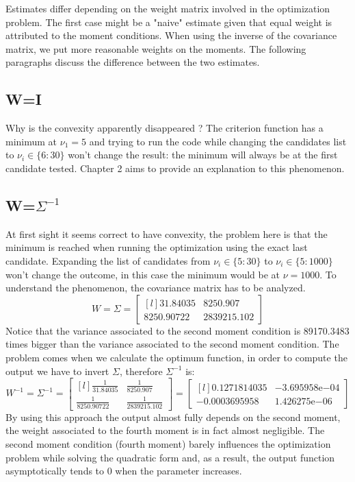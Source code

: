 Estimates differ depending on the weight matrix involved in the optimization problem. The first case might be a "naive" estimate given that equal weight is attributed to the moment conditions.  When using the inverse of the covariance matrix, we put more reasonable weights on the moments. The following paragraphs discuss the difference between the two estimates.


\subsection{W=I}
Why is the convexity apparently disappeared ? The criterion function has a minimum at $\nu_1=5$ and trying to run the code while changing the candidates list to $\nu_i \in \{6:30\}$ won't change the result: the minimum will always be at the first candidate tested. Chapter 2 aims to provide an explanation to this phenomenon.

\subsection{W=$\Sigma^{-1}$}
At first sight it seems correct to have convexity, the problem here is that the minimum is reached when running the optimization using the exact last candidate. Expanding the list of candidates from $\nu_i \in \{5:30\}$ to $\nu_i \in \{5:1000\}$ won't change the outcome, in this case the minimum would be at $\nu=1000$. To understand the phenomenon, the covariance matrix has to be analyzed.
\begin{equation*}
    W=\Sigma=
    \begin{bmatrix}[l]
        31.84035    &8250.907 \\
        8250.90722  &2839215.102
        \end{bmatrix}
\end{equation*}
Notice that the variance associated to the second moment condition is 89170.3483 times bigger than the variance associated to the second moment condition. The problem comes when we calculate the optimum function, in order to compute the output we have to invert $\Sigma$, therefore $\Sigma^{-1}$ is:
\begin{equation*}
    W^{-1}=\Sigma^{-1}=
    \begin{bmatrix}[l]
        \frac{1}{31.84035}    &\frac{1}{8250.907} \\
        \frac{1}{8250.90722}  &\frac{1}{2839215.102}
        \end{bmatrix}=
    \begin{bmatrix}[l]
        0.1271814035    &-3.695958\mathrm{e}{-04} \\
        -0.0003695958    &1.426275\mathrm{e}{-06}
    \end{bmatrix}
\end{equation*}
By using this approach the output almost fully depends on the second moment, the weight associated to the fourth moment is in fact almost negligible. The second moment condition (fourth moment) barely influences the optimization problem while solving the quadratic form and, as a result, the output function asymptotically tends to 0 when the parameter increases.

